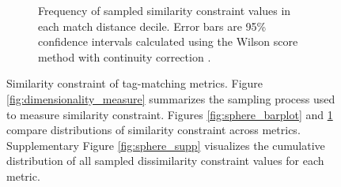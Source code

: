 \begin{figure}[!htbp]
\begin{center}
\begin{minipage}{\linewidth}
\begin{subfigure}[b]{\linewidth}
\begin{minipage}{0.8\textwidth}
\caption{
Frequency of sampled similarity constraint values in each match distance decile.
Error bars are 95\% confidence intervals calculated using the Wilson score method with continuity correction \citep{newcombe1998two}.
}
\label{fig:sphere_distnplot}
\end{minipage}
\end{subfigure}
\end{minipage}

\caption{
Similarity constraint of tag-matching metrics.
Figure \ref{fig:dimensionality_measure} summarizes the sampling process used to measure similarity constraint.
Figures \ref{fig:sphere_barplot} and \ref{fig:sphere_distnplot} compare distributions of similarity constraint across metrics.
Supplementary Figure \ref{fig:sphere_supp} visualizes the cumulative distribution of all sampled dissimilarity constraint values for each metric.
}
\label{fig:sphere}

\end{center}
\end{figure}
